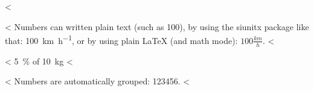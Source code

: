 <%

<%
Numbers can written plain text (such as 100), by using the siunitx package like that:
\SI{100}{\km\per\hour},
or by using plain \LaTeX{} (and math mode):
$100 \frac{\mathit{km}}{h}$.
<%

<%
\SI{5}{\percent} of \SI{10}{kg}
<%

<%
Numbers are automatically grouped: \num{123456}.
<%
